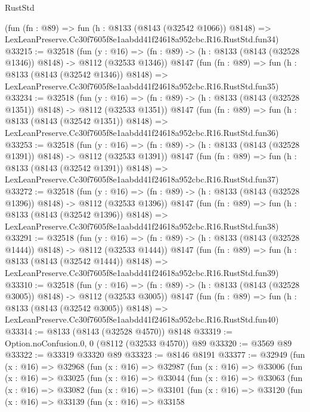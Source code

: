 \begin{lexlean}{RustStd}
\begin{coremodule}
    (fun (fn : @89) =>
    fun (h : @8133 (@8143 (@32542 @1066)) @8148) =>
    LexLeanPreserve.Cc30f7605f8e1aabdd41f24618a952cbc.R16.RustStd.fun34)
@33215 := @32518
    (fun (y : @16) =>
    (fn : @89) -> (h : @8133 (@8143 (@32528 @1346)) @8148) -> @8112 (@32533 @1346))
    @8147
    (fun (fn : @89) =>
    fun (h : @8133 (@8143 (@32542 @1346)) @8148) =>
    LexLeanPreserve.Cc30f7605f8e1aabdd41f24618a952cbc.R16.RustStd.fun35)
@33234 := @32518
    (fun (y : @16) =>
    (fn : @89) -> (h : @8133 (@8143 (@32528 @1351)) @8148) -> @8112 (@32533 @1351))
    @8147
    (fun (fn : @89) =>
    fun (h : @8133 (@8143 (@32542 @1351)) @8148) =>
    LexLeanPreserve.Cc30f7605f8e1aabdd41f24618a952cbc.R16.RustStd.fun36)
@33253 := @32518
    (fun (y : @16) =>
    (fn : @89) -> (h : @8133 (@8143 (@32528 @1391)) @8148) -> @8112 (@32533 @1391))
    @8147
    (fun (fn : @89) =>
    fun (h : @8133 (@8143 (@32542 @1391)) @8148) =>
    LexLeanPreserve.Cc30f7605f8e1aabdd41f24618a952cbc.R16.RustStd.fun37)
@33272 := @32518
    (fun (y : @16) =>
    (fn : @89) -> (h : @8133 (@8143 (@32528 @1396)) @8148) -> @8112 (@32533 @1396))
    @8147
    (fun (fn : @89) =>
    fun (h : @8133 (@8143 (@32542 @1396)) @8148) =>
    LexLeanPreserve.Cc30f7605f8e1aabdd41f24618a952cbc.R16.RustStd.fun38)
@33291 := @32518
    (fun (y : @16) =>
    (fn : @89) -> (h : @8133 (@8143 (@32528 @1444)) @8148) -> @8112 (@32533 @1444))
    @8147
    (fun (fn : @89) =>
    fun (h : @8133 (@8143 (@32542 @1444)) @8148) =>
    LexLeanPreserve.Cc30f7605f8e1aabdd41f24618a952cbc.R16.RustStd.fun39)
@33310 := @32518
    (fun (y : @16) =>
    (fn : @89) -> (h : @8133 (@8143 (@32528 @3005)) @8148) -> @8112 (@32533 @3005))
    @8147
    (fun (fn : @89) =>
    fun (h : @8133 (@8143 (@32542 @3005)) @8148) =>
    LexLeanPreserve.Cc30f7605f8e1aabdd41f24618a952cbc.R16.RustStd.fun40)
@33314 := @8133 (@8143 (@32528 @4570)) @8148
@33319 := Option.noConfusion.{0, 0} (@8112 (@32533 @4570)) @89
@33320 := @3569 @89
@33322 := @33319 @33320 @89
@33323 := @8146 @8191
@33377 := @32949
    (fun (x : @16) =>
    @32968
      (fun (x : @16) =>
      @32987
        (fun (x : @16) =>
        @33006
          (fun (x : @16) =>
          @33025
            (fun (x : @16) =>
            @33044
              (fun (x : @16) =>
              @33063
                (fun (x : @16) =>
                @33082
                  (fun (x : @16) =>
                  @33101
                    (fun (x : @16) =>
                    @33120
                      (fun (x : @16) =>
                      @33139
                        (fun (x : @16) =>
                        @33158

\end{coremodule}
\end{lexlean}
